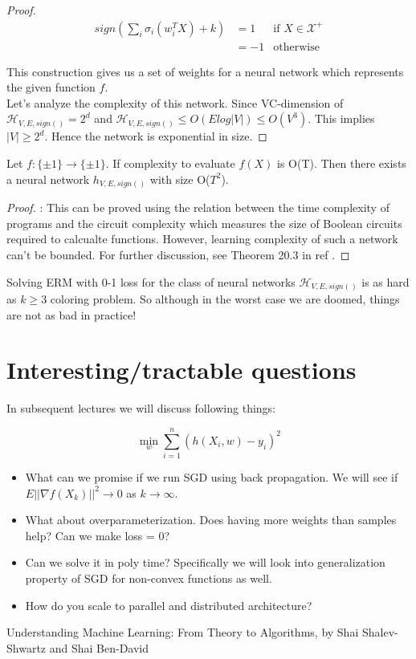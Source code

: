 \documentclass[12pt]{report}
\begin{document}
\begin{proof}
\[
\begin{array}{llr}
sign\left( \sum_{i} \sigma_{i}(w_{i}^TX) + k\right) & = 1 & \text{if } X \in \mathcal{X}^{+}\\
&  = -1 & \text{otherwise}
\end{array}
\]

This construction gives us a set of weights for a neural network which represents the given function $f$. \\

Let's analyze the complexity of this network. Since VC-dimension of $\mathcal{H}_{V,E, sign()} = 2^d$ and $\mathcal{H}_{V,E, sign()} \leq O(Elog|V|) \leq O(V^3)$. This implies $|V| \ge 2^{d}$. Hence the network is exponential in size.

\end{proof}

\begin{theorem}
	\label{Thm2}
Let $f : \{\pm 1\} \rightarrow \{\pm1\}$. If complexity to evaluate $f(X)$ is O(T). Then there exists a neural network $h_{V, E, sign()}$ with size O($T^2$).
\end{theorem}

\begin{proof}: This can be proved using the relation between the time complexity of programs and the circuit complexity which measures the size of Boolean circuits required to calcualte functions. However, learning complexity of such a network can't be bounded. For further discussion, see Theorem 20.3 in ref \cite{UML}. 
\end{proof}

Solving ERM with 0-1 loss for the class of neural networks $\mathcal{H}_{V, E, sign()}$ is as hard as $k \geq 3$ coloring problem. So although in the worst case we are doomed, things are not as bad in practice!

\section{Interesting/tractable questions}
In subsequent lectures we will discuss following things:

$$\min_w \sum_{i=1}^{n} \left(h(X_{i}, w) - y_{i}\right)^{2}$$
\begin{itemize}
	\item What can we promise if we run SGD using back propagation. We will see if $E||\nabla f(X_{k})||^2 \rightarrow 0$ as $k \rightarrow \infty$.
	\item What about overparameterization. Does having more weights than samples help? Can we make loss = 0?
	\item Can we solve it in poly time? Specifically we will look into generalization property of SGD for non-convex functions as well.
	\item How do you scale to parallel and distributed architecture?
\end{itemize}
 \begin{thebibliography}{1}
 	
 	 Understanding Machine Learning: From Theory to Algorithms, by Shai Shalev-Shwartz and Shai Ben-David 	
 \end{thebibliography}
\end{document}
